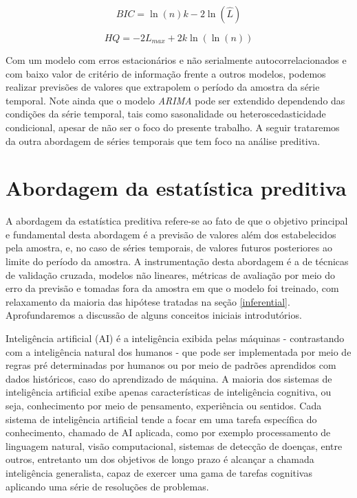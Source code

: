 \documentclass[twocolumn]{rbef}
\newcommand{\1}{\mathbbm{1}}
\begin{document}
\begin{equation} \label{BIC}
    BIC = \ln (n) k - 2 \ln (\hat{L})
\end{equation}

\begin{equation} \label{HQ}
    HQ = -2 L_{max} + 2k \ln (\ln (n))
\end{equation}

Com um modelo com erros estacionários e não serialmente autocorrelacionados e com baixo valor de critério de informação frente a outros modelos, podemos realizar previsões \cite{Hamilton} de valores que extrapolem o período da amostra da série temporal. Note ainda que o modelo \textit{ARIMA} pode ser extendido dependendo das condições da série temporal, tais como sasonalidade ou heteroscedasticidade condicional\cite{Brockwell}, apesar de não ser o foco do presente trabalho. A seguir trataremos da outra abordagem de séries temporais que tem foco na análise preditiva.

\section{Abordagem da estatística preditiva} \label{predictive}

A abordagem da estatística preditiva refere-se ao fato de que o objetivo principal e fundamental desta abordagem é a previsão de valores além dos estabelecidos pela amostra, e, no caso de séries temporais, de valores futuros posteriores ao limite do período da amostra. A instrumentação desta abordagem é a de técnicas de validação cruzada, modelos não lineares, métricas de avaliação por meio do erro da previsão e tomadas fora da amostra em que o modelo foi treinado, com relaxamento da maioria das hipótese tratadas na seção \ref{inferential}. Aprofundaremos a discussão de alguns conceitos iniciais introdutórios.

Inteligência artificial (AI) é a inteligência exibida pelas máquinas - contrastando com a inteligência natural dos humanos - que pode ser implementada por meio de regras pré determinadas por humanos ou por meio de padrões aprendidos com dados históricos, caso do aprendizado de máquina\cite{Oliver}. A maioria dos sistemas de inteligência artificial exibe apenas características de inteligência cognitiva, ou seja, conhecimento por meio de pensamento, experiência ou sentidos. Cada sistema de inteligência artificial tende a focar em uma tarefa específica do conhecimento, chamado de AI aplicada, como por exemplo processamento de linguagem natural, visão computacional, sistemas de detecção de doenças, entre outros, entretanto um dos objetivos de longo prazo é alcançar a chamada inteligência generalista, capaz de exercer uma gama de tarefas cognitivas aplicando uma série de resoluções de problemas\cite{Laird}.
\end{document}
